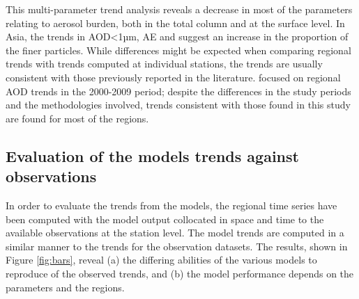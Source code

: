 \documentclass[acp, manuscript]{copernicus}
\begin{document}
This multi-parameter trend analysis reveals a decrease in most of the parameters relating to aerosol burden, both in the total column and at the surface level. In Asia, the trends in AOD<1µm, AE and  suggest an increase in the proportion of the finer particles. While differences might be expected when comparing regional trends with trends computed at individual stations, the trends are usually consistent with those previously reported in the literature.  \cite{DEMEIJ201275} focused on regional AOD trends in the 2000-2009 period; despite the differences in the study periods and the methodologies involved, trends consistent with those found in this study are found for most of the regions.

\subsection{Evaluation of the models trends against observations}\label{mod_evaluation}


In order to evaluate the trends from the models, the regional time series have been computed with the model output collocated in space and time to the available observations at the station level. The model trends are computed in a similar manner to the trends for the observation datasets. The results, shown in Figure \ref{fig:bars}, reveal (a) the differing abilities of the various models to reproduce of the observed trends, and (b) the model performance depends on the parameters and the regions.
\end{document}

